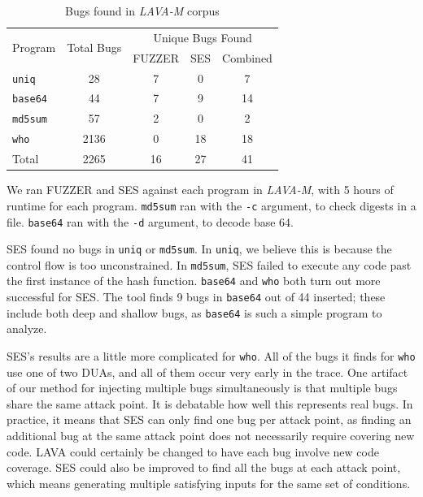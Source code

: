 \begin{table}[h]
\caption{Bugs found in \emph{LAVA-M} corpus}
\centering\footnotesize
\begin{tabular}{l|c|c|c|c} 
\multirow{2}{*}{Program} & \multirow{2}{*}{Total Bugs} & \multicolumn{3}{c}{Unique Bugs Found} \\
              &            & FUZZER       & SES        & Combined \\ \hline 
\verb+uniq+   &    28      & 7            & 0          & 7               \\
\verb+base64+ &    44      & 7            & 9          & 14               \\
\verb+md5sum+ &    57      & 2            & 0          & 2               \\
\verb+who+    &    2136    & 0            & 18         & 18               \\
Total         &    2265    & 16           & 27         & 41               \\
\end{tabular}
\label{table:tool-eval-results-coreutils}
\end{table}

We ran FUZZER and SES against each program in \emph{LAVA-M}, with 5 hours of runtime for each program.
\verb+md5sum+ ran with the \verb+-c+ argument, to check digests in a file.
\verb+base64+ ran with the \verb+-d+ argument, to decode base 64.

SES found no bugs in \verb+uniq+ or \verb+md5sum+.
In \verb+uniq+, we believe this is because the control flow is too unconstrained.
In \verb+md5sum+, SES failed to execute any code past the first instance of the hash function.
\verb+base64+ and \verb+who+ both turn out more successful for SES.
The tool finds 9 bugs in \verb+base64+ out of 44 inserted; these include both deep and shallow bugs, as \verb+base64+ is such a simple program to analyze.

SES's results are a little more complicated for \verb+who+.
All of the bugs it finds for \verb+who+ use one of two DUAs, and all of them occur very early in the trace.
One artifact of our method for injecting multiple bugs simultaneously is that multiple bugs share the same attack point.
It is debatable how well this represents real bugs.
In practice, it means that SES can only find one bug per attack point, as finding an additional bug at the same attack point does not necessarily require covering new code.
LAVA could certainly be changed to have each bug involve new code coverage.
SES could also be improved to find all the bugs at each attack point, which means generating multiple satisfying inputs for the same set of conditions.

